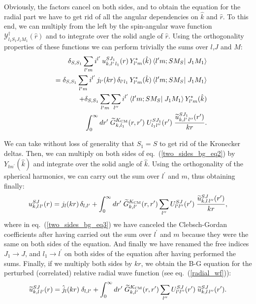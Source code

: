 \documentclass[aps,twocolumn,showpacs,preprintnumbers,amsmath,amssymb,nofootinbib,superscriptaddress,showkeys,noeprint]{revtex4-1}
\begin{document}
Obviously, the factors cancel on both sides, and to obtain the
equation for the radial part we have to get rid of all the angular
dependencies on $\hat{k}$ and $\hat{r}$.  To this end, we can multiply
from the left by the spin-angular wave function
$\mathcal{Y}^\dagger_{l_1 S_1 J_1 M_1}(\hat{r})$ and to integrate over
the solid angle of $\hat{r}$. Using the orthogonality properties of
these functions we can perform trivially the sums over $l$,$J$ and
$M$:
\begin{eqnarray}
 &&\delta_{S,S_1}
 \sum_{l^\prime m} 
i^{l^\prime}\, 
u^{SJ_1}_{k,l^\prime\,l_1}(r)\, 
Y^*_{l^\prime m}(\hat{k})
\left\langle l^\prime m; S M_S\right| \left. J_1 M_1 \right\rangle
\nonumber\\
&&=\delta_{S,S_1}
\sum_{l^\prime m}
 i^{l^\prime}\,
 j_{l^\prime}(kr)\,
 \delta_{l^\prime l_1}\,
 Y^*_{l^\prime m}(\hat{k}) \left\langle
 l^\prime m;SM_S\right|
 \left. J_1M_1\right\rangle
 \nonumber\\
&&+\delta_{S,S_1}
\sum_{l^{\prime}m}
\sum_{l^{\prime\prime}}
i^{l^{\prime}}
\left\langle l^{\prime}m;SM_S
\right|\left. J_1M_1
\right\rangle
Y^*_{l^{\prime}m}(\hat{k})
\nonumber\\
&&\int^\infty_0 dr^\prime\; \widetilde{G}^{K_{\rm CM}}_{k,l_1}(r,r^\prime)\;
U^{SJ_1}_{l_1 l^{\prime\prime}}(r^\prime)\;
\frac{\widetilde{u}^{SJ_1}_{k,l^{\prime}\,l^{\prime\prime}}(r^\prime)}{kr}.\label{two_sides_bg_eq2} 
\end{eqnarray}

We can take without loss of generality that $S_1=S$ to get rid of the
Kronecker deltas.  Then, we can multiply on both sides of
eq.~(\ref{two_sides_bg_eq2}) by $Y_{lm^\prime}(\hat{k})$ and integrate
over the solid angle of $\hat{k}$. Using the orthogonality of the
spherical harmonics, we can carry out the sum over $l^\prime$ and $m$,
thus obtaining finally:
\begin{equation}\label{two_sides_bg_eq3}
u^{SJ}_{k,l\,l^\prime}(r)= j_{l}(kr)\,
 \delta_{l, l^\prime}
+\int^\infty_0 dr^\prime\; \widetilde{G}^{K_{\rm CM}}_{k,l^\prime}(r,r^\prime)
\sum_{l^{\prime\prime}}
U^{SJ}_{l^\prime l^{\prime\prime}}(r^\prime)\;
\frac{\widetilde{u}^{SJ}_{k,l\,l^{\prime\prime}}(r^\prime)}{kr}, 
\end{equation}
where in eq.~(\ref{two_sides_bg_eq3}) we have canceled the
Clebsch-Gordan coefficients after having carried out the sum over
$l^\prime$ and $m$ because they were the same on both sides of the
equation. And finally we have renamed the free indices $J_1\rightarrow
J$, and $l_1\rightarrow l^\prime$ on both sides of the equation after
having performed the sums. Finally, if we multiply both sides by $kr$,
we obtain the B-G equation for the perturbed (correlated) relative
radial wave function (see eq.~(\ref{radial_wf})):
\begin{equation}\label{two_sides_bg_eq_final}
\widetilde{u}^{SJ}_{k,l\,l^\prime}(r)= \hat{j}_{l}(kr)\;
 \delta_{l, l^\prime}
+\int^\infty_0 dr^\prime\; \widetilde{G}^{K_{\rm CM}}_{k,l^\prime}(r,r^\prime)
\sum_{l^{\prime\prime}}
U^{SJ}_{l^\prime l^{\prime\prime}}(r^\prime)\;
\widetilde{u}^{SJ}_{k,l\,l^{\prime\prime}}(r^\prime).  
\end{equation}




\end{document}
